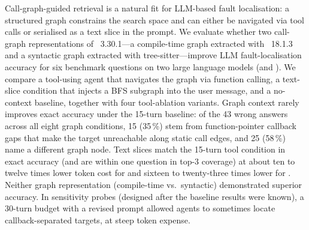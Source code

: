 Call-graph-guided retrieval is a natural fit for LLM-based fault localisation:
a structured graph constrains the search space and can either be navigated via
tool calls or serialised as a text slice in the prompt.
We evaluate whether two call-graph representations of \sqlite~3.30.1---a
compile-time graph extracted with \clang~18.1.3 and a syntactic graph extracted
with tree-sitter---improve LLM fault-localisation accuracy for six benchmark
questions on two large language models (\qwen and \nemotron).
We compare a tool-using agent that navigates the graph via function calling,
a text-slice condition that injects a BFS subgraph into the user message, and a
no-context baseline, together with four tool-ablation variants.
Graph context rarely improves exact accuracy under the 15-turn baseline: of the
43 wrong answers across all eight graph conditions, 15 (35\,\%) stem from function-pointer
callback gaps that make the target unreachable along static call edges, and 25 (58\,\%)
name a different graph node.
Text slices match the 15-turn tool condition in exact accuracy (and are within one question in
top-3 coverage) at about ten to twelve times lower token cost for \qwen and sixteen to
twenty-three times lower for \nemotron.
Neither graph representation (compile-time vs.\ syntactic) demonstrated superior accuracy.
In sensitivity probes (designed after the baseline results were known), a 30-turn budget with a revised prompt allowed agents to sometimes locate callback-separated targets, at steep token expense.
